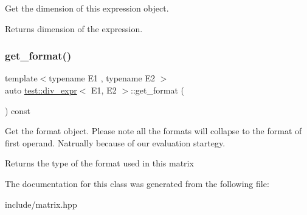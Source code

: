 Get the dimension of this expression object. 

\begin{DoxyReturn}{Returns}
dimension of the expression. 
\end{DoxyReturn}
\mbox{\label{classtest_1_1div__expr_af40ab6cc22828f40ebe6b38075a35ede}} 
\subsubsection{\texorpdfstring{get\_format()}{get\_format()}}
{\footnotesize\ttfamily template$<$typename E1 , typename E2 $>$ \\
auto \mbox{\hyperlink{classtest_1_1div__expr}{test\+::div\+\_\+expr}}$<$ E1, E2 $>$\+::get\+\_\+format (\begin{DoxyParamCaption}{ }\end{DoxyParamCaption}) const\hspace{0.3cm}{\ttfamily [inline]}}



Get the format object. Please note all the formats will collapse to the format of first operand. Natrually because of our evaluation startegy. 

\begin{DoxyReturn}{Returns}
the type of the format used in this matrix 
\end{DoxyReturn}


The documentation for this class was generated from the following file\+:\begin{DoxyCompactItemize}
\item 
include/matrix.\+hpp\end{DoxyCompactItemize}
